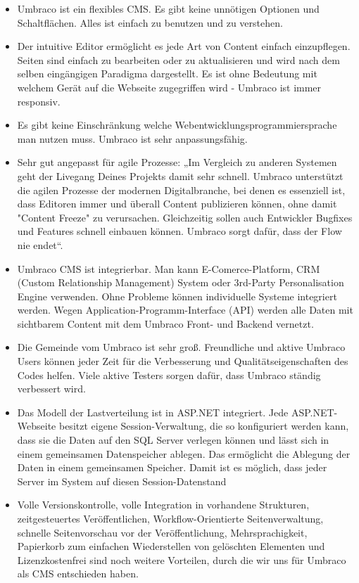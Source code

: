 \begin{itemize}	
	\item Umbraco ist ein flexibles CMS. Es gibt keine unnötigen Optionen und Schaltflächen. Alles ist einfach zu benutzen und zu verstehen.
	\item Der intuitive Editor ermöglicht es jede Art von Content einfach einzupflegen. Seiten sind einfach zu bearbeiten oder zu aktualisieren und wird  nach dem selben eingängigen Paradigma dargestellt. Es ist ohne Bedeutung mit welchem Gerät auf die Webseite zugegriffen wird - Umbraco ist immer responsiv. 
	\item Es gibt keine Einschränkung welche Webentwicklungsprogrammiersprache man nutzen muss. Umbraco ist sehr anpassungsfähig. 
	\item Sehr gut angepasst für agile Prozesse: „Im Vergleich zu anderen Systemen geht der Livegang Deines Projekts damit sehr schnell. Umbraco unterstützt die agilen Prozesse der modernen Digitalbranche, bei denen es essenziell ist, dass Editoren immer und überall Content publizieren können, ohne damit "Content Freeze" zu verursachen. Gleichzeitig sollen auch Entwickler Bugfixes und Features schnell einbauen können. Umbraco sorgt dafür, dass der Flow nie endet“. 
	\item Umbraco CMS ist integrierbar. Man kann E-Comerce-Platform, CRM (Custom Relationship Management) System oder 3rd-Party Personalisation Engine verwenden. Ohne Probleme können individuelle Systeme integriert werden. Wegen Application-Programm-Interface (API) werden alle Daten mit sichtbarem Content mit dem Umbraco Front- und Backend vernetzt.
	\item Die Gemeinde vom Umbraco ist sehr groß. Freundliche und aktive Umbraco Users können jeder Zeit für die Verbesserung und Qualitätseigenschaften des Codes helfen. Viele aktive Testers sorgen dafür, dass Umbraco ständig verbessert wird.
	\item Das Modell der Lastverteilung ist in ASP.NET integriert. Jede ASP.NET-Webseite besitzt eigene Session-Verwaltung, die so konfiguriert werden kann, dass sie die Daten auf den SQL Server verlegen können und lässt sich in einem gemeinsamen Datenspeicher ablegen. Das ermöglicht die Ablegung der Daten in einem gemeinsamen Speicher. Damit ist es möglich, dass jeder Server im System auf diesen Session-Datenstand
	\item Volle Versionskontrolle, volle Integration in vorhandene Strukturen, zeitgesteuertes Veröffentlichen, Workflow-Orientierte Seitenverwaltung, schnelle Seitenvorschau vor der Veröffentlichung, Mehrsprachigkeit, Papierkorb zum einfachen Wiederstellen von gelöschten Elementen und Lizenzkostenfrei sind noch weitere Vorteilen, durch die wir uns für Umbraco als CMS entschieden haben. 
\end{itemize}
	

